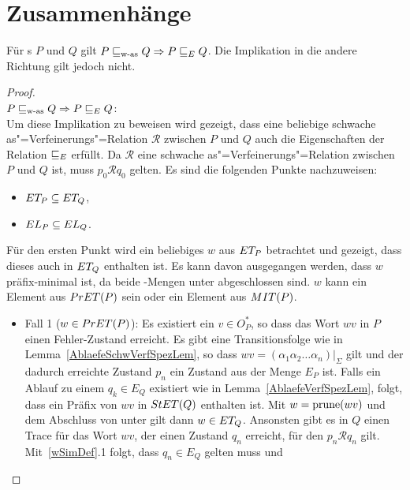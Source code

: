 \section{Zusammenhänge}
\label{errorZusammenh}

\begin{Satz}
  \label{ZusammenhFehlerSatz}
  Für \MEIO{}s $P$ und $Q$ gilt $P\sqsubseteq _{\mathrm{w}\text{-}\mathrm{as}} Q\Rightarrow P \sqsubseteq  _E Q$. Die
  Implikation in die andere Richtung gilt jedoch nicht.
\end{Satz}
\begin{proof}\mbox{}\\
  $P\sqsubseteq _{\mathrm{w}\text{-}\mathrm{as}} Q\Rightarrow P \sqsubseteq  _E Q$:\\
  Um diese Implikation zu beweisen wird gezeigt, dass eine beliebige
  schwache as"=Verfeinerungs"=Relation $\mathcal{R}$ zwischen $P$ und $Q$ auch
  die Eigenschaften der Relation $ \sqsubseteq  _E$ erfüllt. Da $\mathcal{R}$ eine
  schwache as"=Verfeinerungs"=Relation zwischen $P$ und $Q$ ist, muss $p_0
  \mathcal{R} q_0$ gelten. Es sind die folgenden Punkte nachzuweisen:
  \begin{itemize}
    \item $ET _P \subseteq ET _Q$,
    \item $EL _P \subseteq EL _Q$.
  \end{itemize}
  Für den ersten Punkt wird ein beliebiges $w$ aus $ET _P$ betrachtet und
  gezeigt, dass dieses auch in $ET _Q$ enthalten ist. Es kann davon
  ausgegangen werden, dass $w$ präfix-minimal ist, da beide \ET{}-Mengen unter
  \cont{} abgeschlossen sind. $w$ kann ein Element aus $PrET (P)$ sein oder
  ein Element aus $MIT (P)$.
  \begin{itemize}
    \item Fall 1 ($w\in PrET (P)$): Es existiert ein $v\in O_P^*$, so dass das
      Wort $wv$ in $P$ einen Fehler-Zustand erreicht. Es gibt eine
      Transitionsfolge wie in Lemma~\ref{AblaefeSchwVerfSpezLem}, so dass $wv =
      (\alpha _1\alpha _2\dots \alpha _n)|_{\Sigma}$ gilt und der dadurch
      erreichte Zustand $p_n$ ein Zustand aus der Menge $E_P$ ist. Falls ein
      Ablauf zu einem $q_k\in E_Q$ existiert wie in
      Lemma~\ref{AblaefeVerfSpezLem}, folgt, dass ein Präfix von $wv$ in $StET
      (Q)$ enthalten ist. Mit $w=\mathrm{prune} (wv)$ und dem Abschluss von \ET{} unter
      \cont{} gilt dann $w\in ET _Q$. Ansonsten gibt es in $Q$ einen Trace für
      das Wort $wv$, der einen Zustand $q_n$ erreicht, für den $p_n \mathcal{R}
      q_n$ gilt. Mit~\ref{wSimDef}.1 folgt, dass $q_n\in E_Q$ gelten muss und

\end{itemize}
\end{proof}

